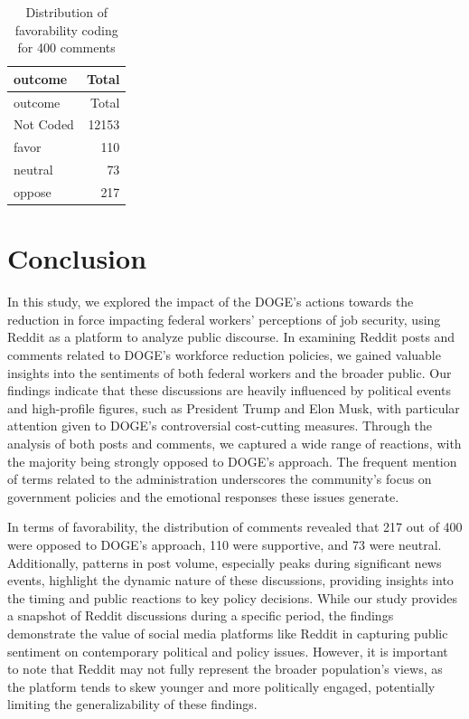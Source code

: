 \documentclass[
  12pt]{article}
\begin{document}
\begin{longtable}[]{@{}lr@{}}
\caption{Distribution of favorability coding for 400
comments}\tabularnewline
\toprule\noalign{}
outcome & Total \\
\midrule\noalign{}
\endfirsthead
\toprule\noalign{}
outcome & Total \\
\midrule\noalign{}
\endhead
\bottomrule\noalign{}
\endlastfoot
Not Coded & 12153 \\
favor & 110 \\
neutral & 73 \\
oppose & 217 \\
\end{longtable}

\section{Conclusion}\label{conclusion}

In this study, we explored the impact of the DOGE's actions towards the
reduction in force impacting federal workers' perceptions of job
security, using Reddit as a platform to analyze public discourse. In
examining Reddit posts and comments related to DOGE's workforce
reduction policies, we gained valuable insights into the sentiments of
both federal workers and the broader public. Our findings indicate that
these discussions are heavily influenced by political events and
high-profile figures, such as President Trump and Elon Musk, with
particular attention given to DOGE's controversial cost-cutting
measures. Through the analysis of both posts and comments, we captured a
wide range of reactions, with the majority being strongly opposed to
DOGE's approach. The frequent mention of terms related to the
administration underscores the community's focus on government policies
and the emotional responses these issues generate.

In terms of favorability, the distribution of comments revealed that 217
out of 400 were opposed to DOGE's approach, 110 were supportive, and 73
were neutral. Additionally, patterns in post volume, especially peaks
during significant news events, highlight the dynamic nature of these
discussions, providing insights into the timing and public reactions to
key policy decisions. While our study provides a snapshot of Reddit
discussions during a specific period, the findings demonstrate the value
of social media platforms like Reddit in capturing public sentiment on
contemporary political and policy issues. However, it is important to
note that Reddit may not fully represent the broader population's views,
as the platform tends to skew younger and more politically engaged,
potentially limiting the generalizability of these findings.
\end{document}
